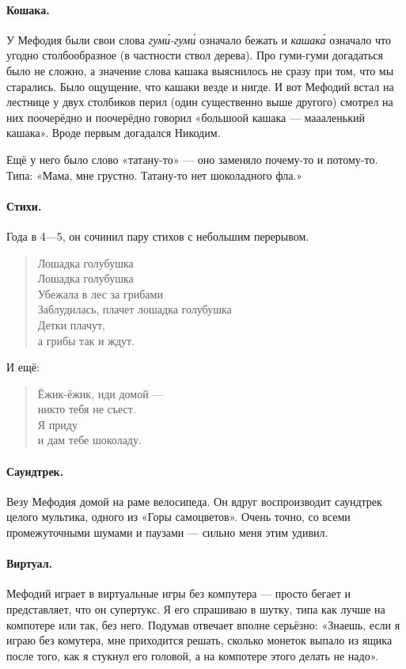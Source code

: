 \documentclass{book}
\begin{document}
\paragraph{Кошака.} У Мефодия были свои слова \textit{гум\'{и}-гум\'{и}} означало бежать и \textit{кашак\'{а}} означало что угодно столбообразное (в частности ствол дерева).
Про гуми-гуми догадаться было не сложно, а значение слова кашака выяснилось не сразу при том, что мы старались.
Было ощущение, что кашаки везде и нигде.
И вот Мефодий встал на лестнице у двух столбиков перил (один существенно выше другого) смотрел на них поочерёдно и поочерёдно говорил «большоой кашака --- маааленький кашака».
Вроде первым догадался Никодим.

Ещё у него было слово «татану-то» --- оно заменяло почему-то и потому-то.
Типа: «Мама, мне грустно. Татану-то нет шоколадного фла.»

\paragraph{Стихи.} Года в 4---5, он сочинил пару стихов с небольшим перерывом.
\begin{verse}
Лошадка голубушка\\
Лошадка голубушка\\
Убежала в лес за грибами\\
Заблудилась, плачет лошадка голубушка\\
Детки плачут,\\
а грибы так и ждут.
\end{verse}
И ещё:
\begin{verse}
Ёжик-ёжик, иди домой ---\\
\quad никто тебя не съест.\\
Я приду\\
\quad и дам тебе шоколаду.
\end{verse}

\paragraph{Саундтрек.} 
Везу Мефодия домой на раме велосипеда.
Он вдруг воспроизводит саундтрек целого мультика, одного из «Горы самоцветов».
Очень точно, со всеми промежуточными шумами и паузами --- сильно меня этим удивил.

\paragraph{Виртуал.} Мефодий играет в виртуальные игры без компутера --- просто бегает и представляет, что он супертукс.
Я его спрашиваю в шутку, типа как лучше на компотере или так, без него.
Подумав отвечает вполне серьёзно: «Знаешь, если я играю без комутера, мне приходится решать, сколько монеток выпало из ящика после того, как я стукнул его головой, а на компотере этого делать не надо».
\end{document}

